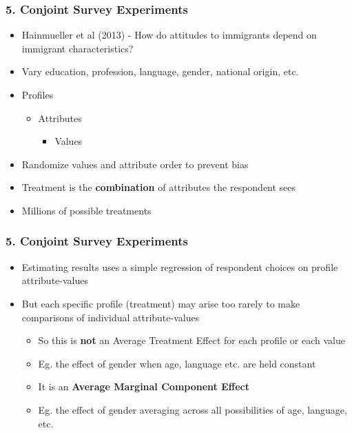 \documentclass[xcolor=x11names,compress]{beamer}\usepackage[]{graphicx}\usepackage[]{color}
\renewcommand{\(}{\begin{columns}}
\renewcommand{\)}{\end{columns}}
\newcommand{\<}[1]{\begin{column}{#1}}
\renewcommand{\>}{\end{column}}
\begin{document}
\begin{frame}
\frametitle{5. Conjoint Survey Experiments}
\begin{itemize}
\item Hainmueller et al (2013) - How do attitudes to immigrants depend on immigrant characteristics?
\pause
\item Vary education, profession, language, gender, national origin, etc.
\pause
\item Profiles
\begin{itemize}
\item Attributes
\begin{itemize}
\item Values
\end{itemize}
\end{itemize}
\pause
\item Randomize values and attribute order to prevent bias
\pause
\item Treatment is the \textbf{combination} of attributes the respondent sees
\pause
\item Millions of possible treatments
\end{itemize}
\end{frame}





\begin{frame}
\frametitle{5. Conjoint Survey Experiments}
\begin{itemize}
\item Estimating results uses a simple regression of respondent choices on profile attribute-values
\pause
\item But each specific profile (treatment) may arise too rarely to make comparisons of individual attribute-values
\pause
\begin{itemize}
\item So this is \textbf{not} an Average Treatment Effect for each profile or each value
\pause
\item Eg. the effect of gender when age, language etc. are held constant
\pause
\item It is an \textbf{Average Marginal Component Effect}
\pause
\item Eg. the effect of gender averaging across all possibilities of age, language, etc.
\end{itemize}
\end{itemize}
\end{frame}
\end{document}
